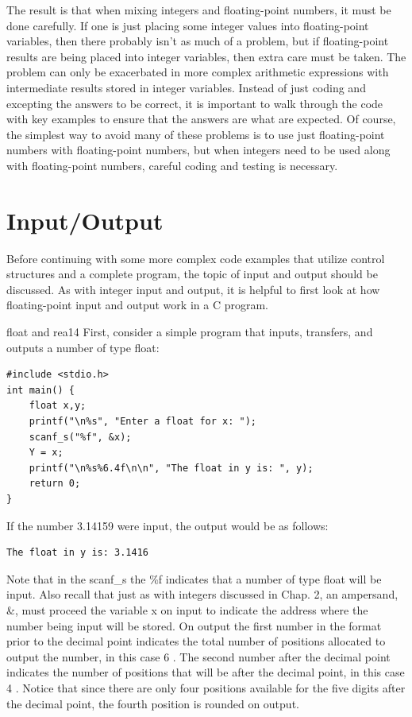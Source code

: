 \documentclass[10pt]{book}
\begin{document}
The result is that when mixing integers and floating-point numbers, it must be done carefully. If one is just placing some integer values into floating-point variables, then there probably isn't as much of a problem, but if floating-point results are being placed into integer variables, then extra care must be taken. The problem can only be exacerbated in more complex arithmetic expressions with intermediate results stored in integer variables. Instead of just coding and excepting the answers to be correct, it is important to walk through the code with key examples to ensure that the answers are what are expected. Of course, the simplest way to avoid many of these problems is to use just floating-point numbers with floating-point numbers, but when integers need to be used along with floating-point numbers, careful coding and testing is necessary.

\section{Input/Output}
Before continuing with some more complex code examples that utilize control structures and a complete program, the topic of input and output should be discussed. As with integer input and output, it is helpful to first look at how floating-point input and output work in a C program.

float and rea14
First, consider a simple program that inputs, transfers, and outputs a number of type float:


\begin{verbatim}
#include <stdio.h>
int main() {
    float x,y;
    printf("\n%s", "Enter a float for x: ");
    scanf_s("%f", &x);
    Y = x;
    printf("\n%s%6.4f\n\n", "The float in y is: ", y);
    return 0;
}
\end{verbatim}

If the number 3.14159 were input, the output would be as follows:

\begin{verbatim}
The float in y is: 3.1416
\end{verbatim}

Note that in the scanf\_s the \%f indicates that a number of type float will be input. Also recall that just as with integers discussed in Chap. 2, an ampersand, \&, must proceed the variable x on input to indicate the address where the number being input will be stored. On output the first number in the format prior to the decimal point indicates the total number of positions allocated to output the number, in this case 6 . The second number after the decimal point indicates the number of positions that will be after the decimal point, in this case 4 . Notice that since there are only four positions available for the five digits after the decimal point, the fourth position is rounded on output.
\end{document}
